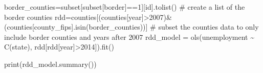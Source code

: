 \documentclass[
  letterpaper,
  DIV=11,
  numbers=noendperiod]{scrreprt}
\newenvironment{Shaded}{\begin{snugshade}}{\end{snugshade}}
\newcommand{\BuiltInTok}[1]{\textcolor[rgb]{0.00,0.23,0.31}{#1}}
\newcommand{\CommentTok}[1]{\textcolor[rgb]{0.37,0.37,0.37}{#1}}
\newcommand{\DecValTok}[1]{\textcolor[rgb]{0.68,0.00,0.00}{#1}}
\newcommand{\NormalTok}[1]{\textcolor[rgb]{0.00,0.23,0.31}{#1}}
\newcommand{\OperatorTok}[1]{\textcolor[rgb]{0.37,0.37,0.37}{#1}}
\newcommand{\StringTok}[1]{\textcolor[rgb]{0.13,0.47,0.30}{#1}}
\begin{document}
\begin{Shaded}
\begin{Highlighting}[]
\NormalTok{border\_counties}\OperatorTok{=}\NormalTok{subset[subset[}\StringTok{\textquotesingle{}border\textquotesingle{}}\NormalTok{]}\OperatorTok{==}\DecValTok{1}\NormalTok{][}\StringTok{\textquotesingle{}id\textquotesingle{}}\NormalTok{].tolist() }\CommentTok{\# create a list of the border counties}
\NormalTok{rdd}\OperatorTok{=}\NormalTok{counties[(counties[}\StringTok{\textquotesingle{}year\textquotesingle{}}\NormalTok{]}\OperatorTok{\textgreater{}}\DecValTok{2007}\NormalTok{)}\OperatorTok{\&}\NormalTok{(counties[}\StringTok{\textquotesingle{}county\_fips\textquotesingle{}}\NormalTok{].isin(border\_counties))] }\CommentTok{\# subset the counties data to only include border counties and years after 2007}
\NormalTok{rdd\_model }\OperatorTok{=}\NormalTok{ ols(}\StringTok{\textquotesingle{}unemployment \textasciitilde{} C(state)\textquotesingle{}}\NormalTok{, rdd[rdd[}\StringTok{\textquotesingle{}year\textquotesingle{}}\NormalTok{]}\OperatorTok{\textgreater{}}\DecValTok{2014}\NormalTok{]).fit()}

\BuiltInTok{print}\NormalTok{(rdd\_model.summary())}
\end{Highlighting}
\end{Shaded}
\end{document}
